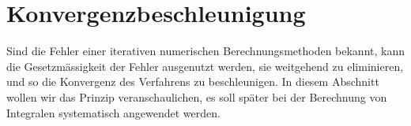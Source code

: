 %
%
%
\section{Konvergenzbeschleunigung
\label{buch:section:beschleunigung}}
Sind die Fehler einer iterativen numerischen Berechnungsmethoden
bekannt, kann die Gesetzmässigkeit der Fehler ausgenutzt werden,
sie weitgehend zu eliminieren, und so die Konvergenz des Verfahrens
zu beschleunigen.
In diesem Abschnitt wollen wir das Prinzip veranschaulichen, es
soll später bei der Berechnung von Integralen systematisch
angewendet werden.




